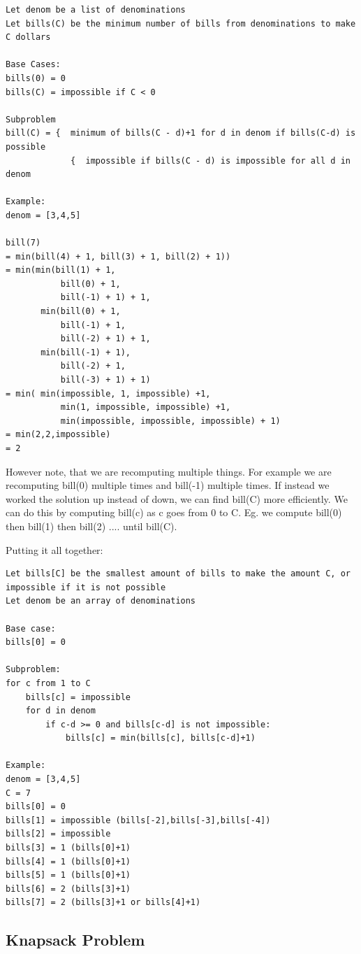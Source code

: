 \documentclass[11pt,oneside]{book}
\begin{document}
\begin{lstlisting}
Let denom be a list of denominations
Let bills(C) be the minimum number of bills from denominations to make C dollars

Base Cases:
bills(0) = 0
bills(C) = impossible if C < 0

Subproblem
bill(C) = {  minimum of bills(C - d)+1 for d in denom if bills(C-d) is possible
             {  impossible if bills(C - d) is impossible for all d in denom

Example:
denom = [3,4,5]

bill(7)
= min(bill(4) + 1, bill(3) + 1, bill(2) + 1))
= min(min(bill(1) + 1,
           bill(0) + 1,
           bill(-1) + 1) + 1, 
       min(bill(0) + 1,
           bill(-1) + 1,
           bill(-2) + 1) + 1, 
       min(bill(-1) + 1),
           bill(-2) + 1,
           bill(-3) + 1) + 1)
= min( min(impossible, 1, impossible) +1,
           min(1, impossible, impossible) +1,
           min(impossible, impossible, impossible) + 1)
= min(2,2,impossible)
= 2

\end{lstlisting}

However note, that we are recomputing multiple things. For example we are recomputing bill(0) multiple times and bill(-1) multiple times. If instead we worked the solution up instead of down, we can find bill(C) more efficiently. We can do this by computing bill(c) as c goes from 0 to C. Eg. we compute bill(0) then bill(1) then bill(2) .... until bill(C).

Putting it all together:

\begin{lstlisting}
Let bills[C] be the smallest amount of bills to make the amount C, or impossible if it is not possible
Let denom be an array of denominations

Base case:
bills[0] = 0

Subproblem:
for c from 1 to C
    bills[c] = impossible
    for d in denom
        if c-d >= 0 and bills[c-d] is not impossible:
            bills[c] = min(bills[c], bills[c-d]+1)

Example:
denom = [3,4,5]
C = 7
bills[0] = 0
bills[1] = impossible (bills[-2],bills[-3],bills[-4])
bills[2] = impossible 
bills[3] = 1 (bills[0]+1)
bills[4] = 1 (bills[0]+1)
bills[5] = 1 (bills[0]+1)
bills[6] = 2 (bills[3]+1)
bills[7] = 2 (bills[3]+1 or bills[4]+1)
\end{lstlisting}

\subsection{Knapsack Problem}
\end{document}
